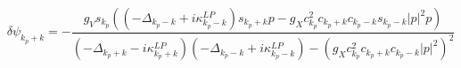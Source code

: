 \documentclass[a4paper,prb,10pt,aps,twocolumn]{revtex4-1}
\begin{document}



\begin{widetext}
\begin{equation}
  \label{eq:76}
  \delta\psi_{k_{p}+k}  =  -\frac{g_{V}s_{k_{p}}\left(\left(-\Delta_{k_{p}-k}+i\kappa_{k_{p}-k}^{LP}\right)s_{k_{p}+k}p-g_{X}c_{k_{p}}^{2}c_{k_{p}+k}c_{k_{p}-k}s_{k_{p}-k}|p|^{2}p\right)}{\left(-\Delta_{k_{p}+k}-i\kappa_{k_{p}+k}^{LP}\right)\left(-\Delta_{k_{p}-k}+i\kappa_{k_{p}-k}^{LP}\right)-\left(g_{X}c_{k_{p}}^{2}c_{k_{p}+k}c_{k_{p}-k}|p|^{2}\right)^{2}}
\end{equation}
\end{widetext}
\end{document}
